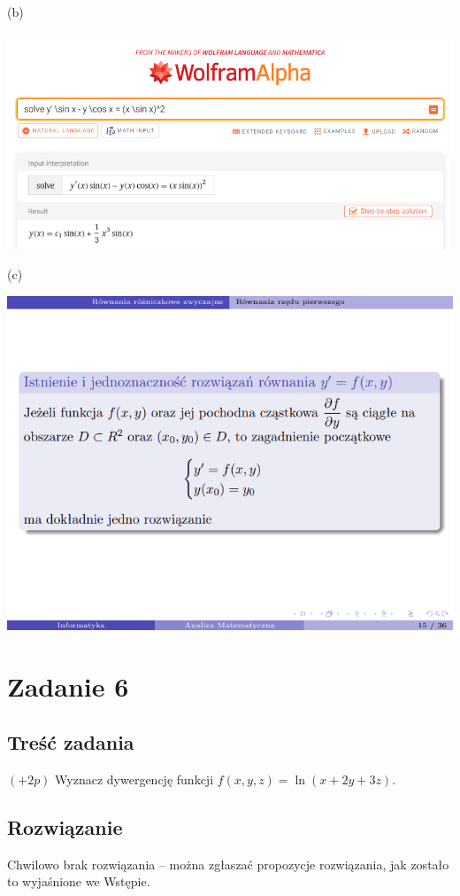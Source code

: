 \documentclass[12pt]{article}
\begin{document}
(b)

\includegraphics[scale=0.425]{am_5_b.png}

(c)

\includegraphics[scale=0.695]{am_5_c.png}

\section{Zadanie 6}
\subsection{Treść zadania}
$(+2p)$ Wyznacz dywergencję funkcji $f(x,y,z) = \ln(x+2y+3z)$.

\subsection{Rozwiązanie}
Chwilowo brak rozwiązania -- można zgłaszać propozycje rozwiązania, jak zostało to wyjaśnione we Wstępie.
\end{document}
